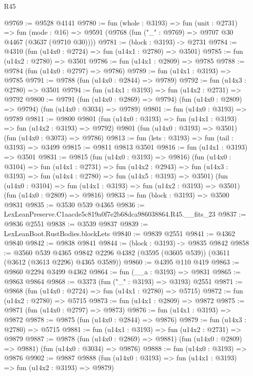 \begin{lexlean}{R45}
\begin{coremodule}
@9769 := @9528 @4141
@9780 := fun (whole : @3193) =>
  fun (unit : @2731) =>
  fun (mode : @16) => @9591 (@9768 (fun ("_" : @9769) => @9707 @30 @4467 (@3637 (@9710 @30))))
@9781 := (block : @3193) -> @2731
@9784 := @4310 (fun (u14x0 : @2724) => fun (u14x1 : @2780) => @3501)
@9785 := fun (u14x2 : @2780) => @3501
@9786 := fun (u14x1 : @2809) => @9785
@9788 := @9784 (fun (u14x0 : @2797) => @9786)
@9789 := fun (u14x1 : @3193) => @9785
@9791 := @9788 (fun (u14x0 : @2844) => @9789)
@9792 := fun (u14x3 : @2780) => @3501
@9794 := fun (u14x1 : @3193) => fun (u14x2 : @2731) => @9792
@9800 := @9791
    (fun (u14x0 : @2869) => @9794)
    (fun (u14x0 : @2809) => @9794)
    (fun (u14x0 : @3034) => @9789)
@9801 := fun (u14x0 : @3193) => @9789
@9811 := @9800
    @9801
    (fun (u14x0 : @3193) => fun (u14x1 : @3193) => fun (u14x2 : @3193) => @9792)
    @9801
    (fun (u14x0 : @3193) => @3501)
    (fun (u14x0 : @3073) => @9786)
@9813 := fun (lets : @3193) => fun (tail : @3193) => @3499
@9815 := @9811 @9813 @3501
@9816 := fun (u14x1 : @3193) => @3501
@9831 := @9815
    (fun (u14x0 : @3193) => @9816)
    (fun (u14x0 : @3104) =>
    fun (u14x1 : @2731) =>
    fun (u14x2 : @2943) =>
    fun (u14x3 : @3193) => fun (u14x4 : @2780) => fun (u14x5 : @3193) => @3501)
    (fun (u14x0 : @3104) => fun (u14x1 : @3193) => fun (u14x2 : @3193) => @3501)
    (fun (u14x0 : @2809) => @9816)
@9833 := fun (block : @3193) => @3500 @9831
@9835 := @3530 @539 @4365
@9836 := LexLeanPreserve.C1aacde5c819a0f7e2b68dca986038864.R45.__fits_23
@9837 := @9836 @2551
@9838 := @3539 @9837
@9839 := LexLeanBoot.RustBodies.blockLets
@9840 := @9839 @2551
@9841 := @4362 @9840
@9842 := @9838 @9841
@9844 := (block : @3193) -> @9835 @9842
@9858 := @3560
    @539
    @4365
    @9842
    @2296
    @4382
    (@3595 (@3605 @539))
    (@3611 (@3612 (@3613 @2296) @4365 @3589))
@9860 := @4395 @110 @419
@9863 := @9860 @2294 @3499 @4362
@9864 := fun (__a : @3193) => @9831
@9865 := @9863 @9864
@9868 := @3373 (fun ("_" : @3193) => @3193) @2551
@9871 := @9868 (fun (u14x0 : @2724) => fun (u14x1 : @2780) => @5715)
@9872 := fun (u14x2 : @2780) => @5715
@9873 := fun (u14x1 : @2809) => @9872
@9875 := @9871 (fun (u14x0 : @2797) => @9873)
@9876 := fun (u14x1 : @3193) => @9872
@9878 := @9875 (fun (u14x0 : @2844) => @9876)
@9879 := fun (u14x3 : @2780) => @5715
@9881 := fun (u14x1 : @3193) => fun (u14x2 : @2731) => @9879
@9887 := @9878
    (fun (u14x0 : @2869) => @9881)
    (fun (u14x0 : @2809) => @9881)
    (fun (u14x0 : @3034) => @9876)
@9888 := fun (u14x0 : @3193) => @9876
@9902 := @9887
    @9888
    (fun (u14x0 : @3193) => fun (u14x1 : @3193) => fun (u14x2 : @3193) => @9879)

\end{coremodule}
\end{lexlean}
